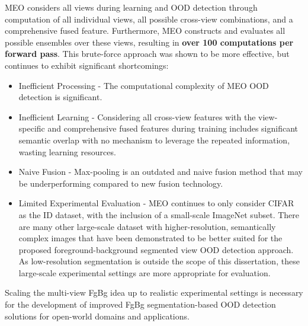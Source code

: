 MEO considers all views during learning and OOD detection through computation of all individual views, all possible cross-view combinations, and a comprehensive fused feature. Furthermore, MEO constructs and evaluates all possible ensembles over these views, resulting in \textbf{over 100 computations per forward pass}. This brute-force approach was shown to be more effective, but continues to exhibit significant shortcomings:
\begin{itemize}
    \item Inefficient Processing - The computational complexity of MEO OOD detection is significant.
    \item Inefficient Learning - Considering all cross-view features with the view-specific and comprehensive fused features during training includes significant semantic overlap with no mechanism to leverage the repeated information, wasting learning resources.
    \item Naive Fusion - Max-pooling is an outdated and naive fusion method \cite{zhao2023cddfuse,chen2021crossvit} that may be underperforming compared to new fusion technology.
    \item Limited Experimental Evaluation - MEO continues to only consider CIFAR as the ID dataset, with the inclusion of a small-scale ImageNet subset. There are many other large-scale dataset with higher-resolution, semantically complex images that have been demonstrated to be better suited for the proposed foreground-background segmented view OOD detection approach. As low-resolution segmentation is outside the scope of this dissertation, these large-scale experimental settings are more appropriate for evaluation.
\end{itemize}
Scaling the multi-view FgBg idea up to realistic experimental settings is necessary for the development of improved FgBg segmentation-based OOD detection solutions for open-world domains and applications.

%
%


